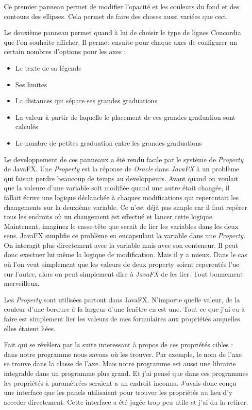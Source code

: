 Ce premier panneau permet de modifier l'opacité et les couleurs du fond et des contours des ellipses. Cela permet de faire des choses aussi variées que ceci.


Le deuxième panneau permet quand à lui de choisir le type de lignes Concordia que l'on souhaite afficher. Il permet ensuite pour chaque axes de configurer un certain nombres d'options pour les axes : 
\begin{itemize}
\item Le texte de sa légende
\item Ses limites
\item La distances qui sépare ses grandes graduations
\item La valeur à partir de laquelle le placement de ces grandes graduation sont calculés
\item Le nombre de petites graduation entre les grandes graduations
\end{itemize}

Le developpement de ces panneaux a été rendu facile par le système de \textit{Property} de JavaFX. Une \textit{Property} est la réponse de \textit{Oracle} dans \textit{JavaFX} à un problème qui faisait perdre beaucoup de temps au developpeurs. Avant quand on voulait que la valeure d'une variable soit modifiée quand une autre était changée, il fallait écrire une logique déclanchée à chaques modifications qui repercutait les changements sur la deuxième variable. Ce n'est déjà pas simple car il faut repèrer tous les endroits où un changement est effectué et lancer cette logique. Maintenant, imaginez le casse-tête que serait de lier les variables dans les deux sens. JavaFX simplifie ce problème en encapsulant la variable dans une \textit{Property}. On interagit plus directement avec la variable mais avec son conteneur. Il peut donc exectuer lui même la logique de modification. Mais il y a mieux. Dans le cas où l'on veut simplement que les valeurs de deux property soient repercutés l'ue sur l'autre, alors on peut simplement dire à \textit{JavaFX} de les lier. Tout bonnement merveilleux.

Les \textit{Property} sont utilisées partout dans JavaFX. N'importe quelle valeur, de la couleur d'une bordure à la largeur d'une fenêtre en est une. Tout ce que j'ai eu à faire est simplement lier les valeurs de mes formulaires aux propriétés auquelles elles étaient liées. 

Fait qui se révèlera par la suite interessant à propos de ces propriétés cibles : dans notre programme nous savons où les trouver. Par exemple, le nom de l'axe se trouve dans la classe de l'axe. Mais notre programme est aussi une librairie integrable dans un programme plus grand. Et j'ai pensé que dans ces programmes les propriétés à paramètrées seraient a un endroit inconnu. J'avais donc conçu une interface que les panels utilisaient pour trouver les propriétés au lieu d'y acceder directement. Cette interface a été jugée trop peu utile et j'ai du la retirer.

